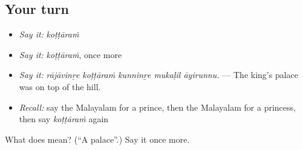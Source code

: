 \subsection*{Your turn}
\begin{itemize}
\raggedright
  \item \emph{Say it:} \emph{koṭṭāraṁ}
  \item \emph{Say it:} \emph{koṭṭāraṁ}, once more
  \item \emph{Say it:} \emph{rājāvinṟe koṭṭāraṁ kunninṟe mukaḷil āyirunnu.} — The king's palace was on top of the hill.
  \item \emph{Recall:} say the Malayalam for a prince, then the Malayalam for a princess, then say \emph{koṭṭāraṁ} again
\end{itemize}

\begin{tcolorbox}[breakable,colback=teal!4,colframe=teal!35!black,title={Before you move on}]
What does  mean? (\textquotedblleft{}A palace\textquotedblright{}.) Say it once more.
\end{tcolorbox}
